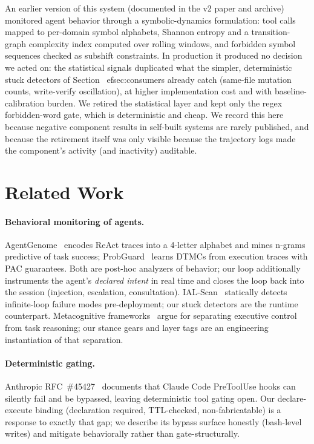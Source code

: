 \documentclass{article}
\begin{document}
An earlier version of this system (documented in the v2 paper and archive) monitored agent behavior through a symbolic-dynamics formulation: tool calls mapped to per-domain symbol alphabets, Shannon entropy and a transition-graph complexity index computed over rolling windows, and forbidden symbol sequences checked as subshift constraints. In production it produced no decision we acted on: the statistical signals duplicated what the simpler, deterministic stuck detectors of Section~
ef{sec:consumers} already catch (same-file mutation counts, write-verify oscillation), at higher implementation cost and with baseline-calibration burden. We retired the statistical layer and kept only the regex forbidden-word gate, which is deterministic and cheap. We record this here because negative component results in self-built systems are rarely published, and because the retirement itself was only visible because the trajectory logs made the component's activity (and inactivity) auditable.

\section{Related Work}

\paragraph{Behavioral monitoring of agents.}
AgentGenome~\cite{deng2026agentgenome} encodes ReAct traces into a 4-letter alphabet and mines n-grams predictive of task success; ProbGuard~\cite{chen2025probguard} learns DTMCs from execution traces with PAC guarantees. Both are post-hoc analyzers of behavior; our loop additionally instruments the agent's \emph{declared intent} in real time and closes the loop back into the session (injection, escalation, consultation). IAL-Scan~\cite{ialscan} statically detects infinite-loop failure modes pre-deployment; our stuck detectors are the runtime counterpart. Metacognitive frameworks~\cite{metacogsurvey, metacogagent} argue for separating executive control from task reasoning; our stance gears and layer tags are an engineering instantiation of that separation.

\paragraph{Deterministic gating.}
Anthropic RFC~\#45427~\cite{anthropic45427} documents that Claude Code PreToolUse hooks can silently fail and be bypassed, leaving deterministic tool gating open. Our declare-execute binding (declaration required, TTL-checked, non-fabricatable) is a response to exactly that gap; we describe its bypass surface honestly (bash-level writes) and mitigate behaviorally rather than gate-structurally.
\end{document}
